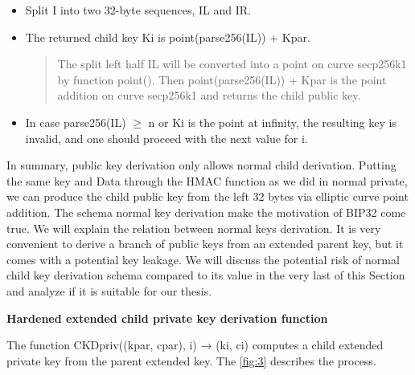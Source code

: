 \begin{adjustwidth}{0.5cm}{}
\begin{itemize}
        \item Split I into two 32-byte sequences, IL and IR.
              \bigskip

        \item The returned child key Ki is point(parse256(IL)) + Kpar.

              \begin{quote}
                The split left half IL will be converted into a point on curve secp256k1 by function point(). Then point(parse256(IL)) + Kpar is the point addition on curve secp256k1 and returns the child public key. 
            \end{quote}
              \bigskip

        \item In case parse256(IL) $\geq$ n or Ki is the point at infinity, the resulting key is invalid, and one should proceed with the next value for i.

    \end{itemize}

    In summary, public key derivation only allows normal child derivation. 
    Putting the same key and Data through the HMAC function as we did in normal private, we can produce the child public key from the left 32 bytes via elliptic curve point addition. 
    The schema normal key derivation make the motivation of BIP32 come true. We will explain the relation between normal keys derivation. 
    It is very convenient to derive a branch of public keys from an extended parent key, but it comes with a potential key leakage. 
    We will discuss the potential risk of normal child key derivation schema compared to its value in the very last of this Section and analyze if it is suitable for our thesis.


\bigskip
{\textbf{Hardened extended child private key derivation function}}

The function CKDpriv((kpar, cpar), i) → (ki, ci) computes a child extended private key from the parent extended key. 
The \autoref{fig:3} describes the process.


\end{adjustwidth}
